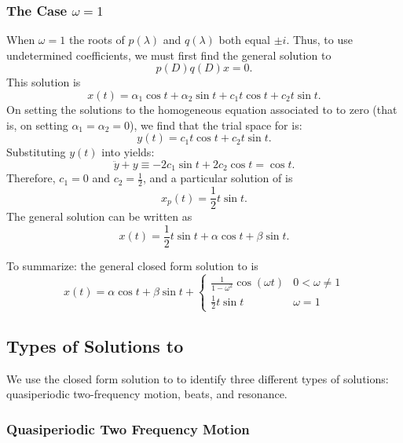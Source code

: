 \documentclass{ximera}
\begin{document}
\subsubsection*{The Case $\omega= 1$}

When $\omega= 1$ the roots of $p(\lambda)$ and $q(\lambda)$ both equal 
$\pm i$.  Thus, to use undetermined coefficients, we must first find the 
general solution to 
\[
p(D)q(D)x = 0.
\]
This solution is 
\[
x(t) = \alpha_1\cos t + \alpha_2\sin t + c_1t\cos t + c_2t\sin t.
\]
On setting the solutions to the homogeneous equation associated to 
 to zero (that is, on setting $\alpha_1=\alpha_2=0$), we 
find that the trial space for  is:
\[
y(t) = c_1t\cos t + c_2t\sin t.
\]
Substituting $y(t)$ into  yields:
\[
\ddot{y} + y \equiv -2c_1\sin t + 2c_2\cos t = \cos t.
\]
Therefore, $c_1=0$ and $c_2=\frac{1}{2}$, and a particular solution of 
 is 
\[
x_p(t) = \frac{1}{2}t\sin t.
\]
The general solution can be written as
\[
x(t) = \frac{1}{2}t\sin t+\alpha\cos t+\beta\sin t.
\]

To summarize: the general closed form solution to  is
\begin{equation}  \label{eq:uspfsoln}
x(t) = \alpha\cos t+\beta\sin t + \left\{\begin{array}{lr}
\frac{1}{1-\omega ^2}\cos(\omega t)  & 0<\omega\neq 1\\  
\frac{1}{2}t\sin t & \omega=1 \end{array}\right.\end{equation}

\subsection*{Types of Solutions to }

We use the closed form solution  to  to
identify three different types of solutions: quasiperiodic two-frequency 
motion, beats, and resonance.

\subsubsection*{Quasiperiodic Two Frequency Motion}
\end{document}
